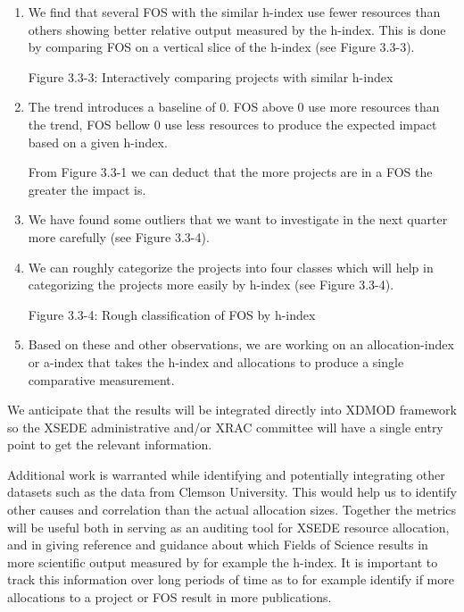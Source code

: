 \begin{enumerate}

\item We find that several FOS with the similar h-index use fewer resources than others showing better relative output measured by the h-index. This is done by comparing FOS on a vertical slice of the h-index (see Figure 3.3-3). 
 
Figure 3.3-3: Interactively comparing projects with similar h-index 

\item The trend introduces a baseline of 0. FOS above 0 use more resources than the trend, FOS bellow 0 use less resources to produce the expected impact based on a given h-index.

From Figure 3.3-1 we can deduct that the more projects are in a FOS the greater the impact is. 

\item We have found some outliers that we want to investigate in the next quarter more carefully (see Figure 3.3-4).

\item We can roughly categorize the projects into four classes which will help in categorizing the projects more easily by h-index (see Figure 3.3-4).
 
Figure 3.3-4: Rough classification of FOS by h-index

\item Based on these and other observations, we are working on an allocation-index or a-index that takes the h-index and allocations to produce a single comparative measurement.

\end{enumerate}

We anticipate that the results will be  integrated directly into XDMOD framework so the XSEDE administrative and/or XRAC committee will have a single entry point to get the relevant information. 

Additional work is warranted while identifying and potentially integrating other datasets such as the data from Clemson University. This would help us to identify other causes and correlation than the actual allocation sizes. Together the metrics will be useful both in serving as an auditing tool for XSEDE resource allocation, and in giving reference and guidance about which Fields of Science results in more scientific output measured by for example the h-index.  It is important to track this information over long periods of time as to for example identify if more allocations to a project or FOS result in more publications.

